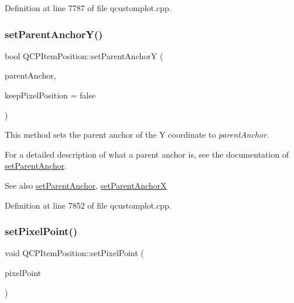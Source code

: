 Definition at line 7787 of file qcustomplot.\+cpp.

\mbox{\label{class_q_c_p_item_position_add5ec1db9d19cec58a3b5c9e0a0c3f9d}} 
\subsubsection{\texorpdfstring{set\+Parent\+Anchor\+Y()}{setParentAnchorY()}}
{\footnotesize\ttfamily bool Q\+C\+P\+Item\+Position\+::set\+Parent\+AnchorY (\begin{DoxyParamCaption}\item[{\hyperlink{class_q_c_p_item_anchor}{Q\+C\+P\+Item\+Anchor} $\ast$}]{parent\+Anchor,  }\item[{bool}]{keep\+Pixel\+Position = {\ttfamily false} }\end{DoxyParamCaption})}

This method sets the parent anchor of the Y coordinate to {\itshape parent\+Anchor}.

For a detailed description of what a parent anchor is, see the documentation of \hyperlink{class_q_c_p_item_position_ac094d67a95d2dceafa0d50b9db3a7e51}{set\+Parent\+Anchor}.

\begin{DoxySeeAlso}{See also}
\hyperlink{class_q_c_p_item_position_ac094d67a95d2dceafa0d50b9db3a7e51}{set\+Parent\+Anchor}, \hyperlink{class_q_c_p_item_position_add71461a973927c74e42179480916d9c}{set\+Parent\+AnchorX} 
\end{DoxySeeAlso}


Definition at line 7852 of file qcustomplot.\+cpp.

\mbox{\label{class_q_c_p_item_position_ab404e56d9ac2ac2df0382c57933a71ef}} 
\subsubsection{\texorpdfstring{set\+Pixel\+Point()}{setPixelPoint()}}
{\footnotesize\ttfamily void Q\+C\+P\+Item\+Position\+::set\+Pixel\+Point (\begin{DoxyParamCaption}\item[{const Q\+PointF \&}]{pixel\+Point }\end{DoxyParamCaption})}

